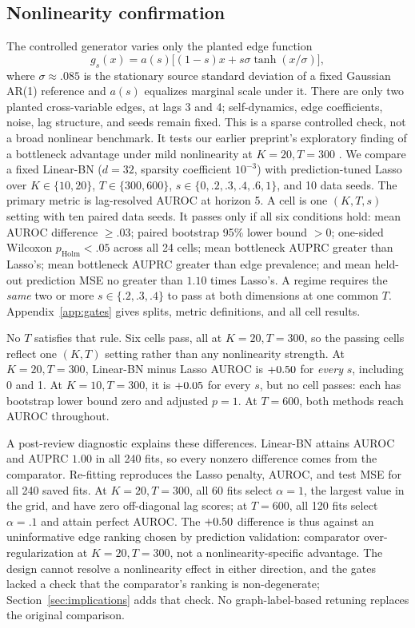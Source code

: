 \subsection{Nonlinearity confirmation}
\label{sec:nonlinearity}

The controlled generator varies only the planted edge function
\[
 g_s(x)=a(s)\big[(1-s)x+s\sigma\tanh(x/\sigma)\big],
\]
where $\sigma\approx.085$ is the stationary source standard deviation of a
fixed Gaussian AR(1) reference and $a(s)$ equalizes marginal scale under it.
There are only two planted cross-variable edges, at lags 3 and 4;
self-dynamics, edge coefficients, noise, lag structure, and seeds remain
fixed. This is a sparse controlled check, not a broad nonlinear benchmark.
It tests our earlier preprint's exploratory finding of a bottleneck advantage
under mild nonlinearity at $K=20,T=300$ \citep{lade2026prediction}.
We compare a fixed Linear-BN ($d=32$, sparsity coefficient $10^{-3}$)
with prediction-tuned Lasso over $K\in\{10,20\}$,
$T\in\{300,600\}$, $s\in\{0,.2,.3,.4,.6,1\}$, and 10 data seeds.
The primary metric is lag-resolved AUROC at horizon 5. A cell is one
$(K,T,s)$ setting with ten paired data seeds. It passes only if all six
conditions hold: mean AUROC difference $\geq.03$; paired bootstrap 95\%
lower bound $>0$; one-sided Wilcoxon $p_{\mathrm{Holm}}<.05$ across all 24
cells; mean bottleneck AUPRC greater than Lasso's; mean bottleneck AUPRC
greater than edge prevalence; and mean held-out prediction MSE no greater
than $1.10$ times Lasso's. A regime requires the \emph{same} two or more
$s\in\{.2,.3,.4\}$ to pass at both dimensions at one common $T$.
Appendix~\ref{app:gates} gives splits, metric definitions, and all cell results.

No $T$ satisfies that rule. Six cells pass, all at $K=20,T=300$, so the
passing cells reflect one $(K,T)$ setting rather than any nonlinearity
strength. At
$K=20,T=300$, Linear-BN minus Lasso AUROC is
$+0.50$ for \emph{every} $s$, including 0 and 1. At
$K=10,T=300$, it is $+0.05$ for every $s$, but no cell
passes: each has bootstrap lower bound zero and adjusted $p=1$. At $T=600$,
both methods reach AUROC \NonlinearityTSixHundredAUROC{} throughout.

A post-review diagnostic explains these differences. Linear-BN attains
AUROC and AUPRC $1.00$ in all 240 fits, so every nonzero difference comes
from the comparator. Re-fitting reproduces the Lasso penalty, AUROC, and
test MSE for all 240 saved fits. At $K=20,T=300$, all 60 fits select
$\alpha=1$, the largest value in the grid, and have zero off-diagonal lag
scores; at $T=600$, all 120 fits select $\alpha=.1$ and attain perfect AUROC.
The $+0.50$ difference is thus against an uninformative
edge ranking chosen by prediction validation: comparator over-regularization
at $K=20,T=300$, not a nonlinearity-specific advantage. The design cannot
resolve a nonlinearity effect in either direction, and the gates lacked a
check that the comparator's ranking is non-degenerate; Section~\ref{sec:implications}
adds that check. No graph-label-based retuning replaces the original
comparison.

